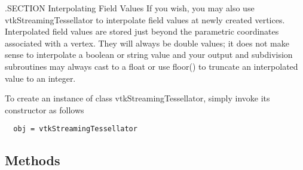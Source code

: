  .SECTION Interpolating Field Values
 If you wish, you may also use  vtkStreamingTessellator to interpolate field
 values at newly created vertices. Interpolated field values are stored just beyond
 the parametric coordinates associated with a vertex. They will always be  double
 values; it does not make sense to interpolate a boolean or string value and your
 output and subdivision subroutines may always cast to a  float or use  floor() to
 truncate an interpolated value to an integer.


To create an instance of class vtkStreamingTessellator, simply
invoke its constructor as follows
\begin{verbatim}
  obj = vtkStreamingTessellator
\end{verbatim}
\subsection{Methods}


